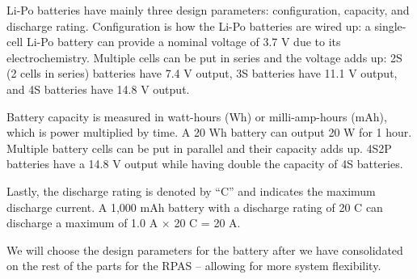 Li-Po batteries have mainly three design parameters: configuration, capacity, and discharge rating. 
Configuration is how the Li-Po batteries are wired up: a single-cell Li-Po battery can provide a 
nominal voltage of 3.7 V due to its electrochemistry. Multiple cells can be put in series and the 
voltage adds up: 2S (2 cells in series) batteries have 7.4 V output, 3S batteries have 11.1 V output,
 and 4S batteries have 14.8 V output.

Battery capacity is measured in watt-hours (Wh) or milli-amp-hours (mAh), which is power multiplied by time. A 20 Wh battery can output 20 W for 1 hour. Multiple battery cells can be put in parallel and their capacity adds up. 4S2P batteries have a 14.8 V output while having double the capacity of 4S batteries.

Lastly, the discharge rating is denoted by “C” and indicates the maximum discharge current. A 1,000 
mAh battery with a discharge rating of 20 C can discharge a maximum of 1.0 A $\times$ 20 C = 20 A.

We will choose the design parameters for the battery after we have consolidated on the rest of the parts for the RPAS -- allowing for more system flexibility.
